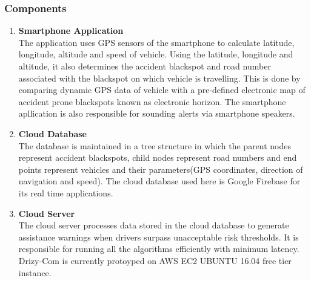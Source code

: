 \subsubsection{Components}
\begin{enumerate}
    \item \textbf{Smartphone Application}\\ The application uses GPS sensors of the smartphone to calculate latitude, longitude, altitude and speed of vehicle. Using the latitude, longitude and altitude, it also determines the accident blackspot and road number associated with the blackspot on which vehicle is travelling. This is done by comparing dynamic GPS data of vehicle with a pre-defined electronic map of accident prone blackspots known as electronic horizon. The smartphone apllication is also responsible for sounding alerts via smartphone speakers. 
    \item \textbf{Cloud Database} \\ The database is maintained in a tree structure in which the parent nodes represent accident blackspots, child nodes represent road numbers and end points represent vehicles and their parameters(GPS coordinates, direction of navigation and speed). The cloud database used here is Google Firebase for its real time applications.
    
    \item \textbf{Cloud Server} \\ The cloud server processes data stored in the cloud database to generate assistance warnings when drivers surpass unacceptable risk thresholds. It is responsible for running all the algorithms efficiently with minimum latency. Drizy-Com is currently protoyped on AWS EC2 UBUNTU 16.04 free tier instance.
\end{enumerate}
